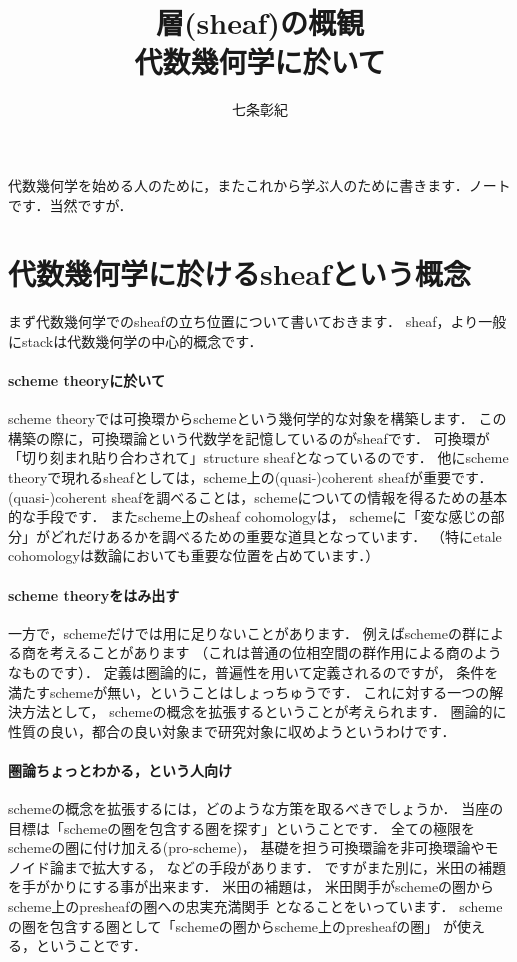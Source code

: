 \documentclass[]{jsarticle}
\begin{document}
    \title{層(sheaf)の概観 \\ {\normalsize 代数幾何学に於いて}}
    \author{七条彰紀}
    \maketitle

    代数幾何学を始める人のために，またこれから学ぶ人のために書きます．ノートです．当然ですが．

    \section{代数幾何学に於けるsheafという概念}
    まず代数幾何学でのsheafの立ち位置について書いておきます．
    sheaf，より一般にstackは代数幾何学の中心的概念です．

    \paragraph{scheme theoryに於いて}
    scheme theoryでは可換環からschemeという幾何学的な対象を構築します．
    この構築の際に，可換環論という代数学を記憶しているのがsheafです．
    可換環が「切り刻まれ貼り合わされて」structure sheafとなっているのです．
    他にscheme theoryで現れるsheafとしては，scheme上の(quasi-)coherent sheafが重要です．
    (quasi-)coherent sheafを調べることは，schemeについての情報を得るための基本的な手段です．
    またscheme上のsheaf cohomologyは，
    schemeに「変な感じの部分」がどれだけあるかを調べるための重要な道具となっています．
    （特にetale cohomologyは数論においても重要な位置を占めています．）

    \paragraph{scheme theoryをはみ出す}
    一方で，schemeだけでは用に足りないことがあります．
    例えばschemeの群による商を考えることがあります
    （これは普通の位相空間の群作用による商のようなものです）．
    定義は圏論的に，普遍性を用いて定義されるのですが，
    条件を満たすschemeが無い，ということはしょっちゅうです．
    これに対する一つの解決方法として，
    schemeの概念を拡張するということが考えられます．
    圏論的に性質の良い，都合の良い対象まで研究対象に収めようというわけです．

    \paragraph{圏論ちょっとわかる，という人向け}
    schemeの概念を拡張するには，どのような方策を取るべきでしょうか．
    当座の目標は「schemeの圏を包含する圏を探す」ということです．
    全ての極限をschemeの圏に付け加える(pro-scheme)，
    基礎を担う可換環論を非可換環論やモノイド論まで拡大する，
    などの手段があります．
    ですがまた別に，米田の補題を手がかりにする事が出来ます．
    米田の補題は，
    米田関手がschemeの圏からscheme上のpresheafの圏への忠実充満関手
    となることをいっています．
    schemeの圏を包含する圏として「schemeの圏からscheme上のpresheafの圏」
    が使える，ということです．
\end{document}
